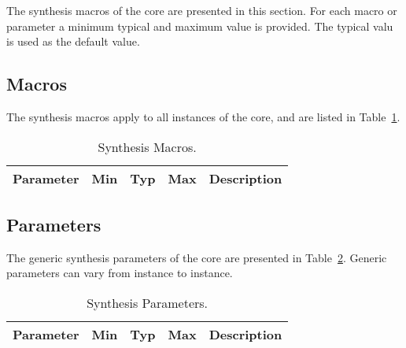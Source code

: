 The synthesis macros of the core are presented in this section. For each macro
or parameter a minimum typical and maximum value is provided. The typical valu
is used as the default value.

\subsection{Macros}
\label{sec:macr}

The synthesis macros apply to all instances of the core, and are listed in Table~\ref{tab:sm}.

\begin{table}[H]
  \centering
    \begin{tabularx}{\textwidth}{ | c | c | c | c | X | }
    \hline
    \rowcolor{iob-green}
    {\bf Parameter} & {\bf Min} & {\bf Typ} & {\bf Max} & {\bf Description} \\\hline

    

    \end{tabularx}
  \caption{Synthesis Macros.}
  \label{tab:sm}
\end{table}

\subsection{Parameters}
\label{sec:param}

The generic synthesis parameters of the core are presented in Table~\ref{tab:sp}. Generic parameters can vary from instance to instance.

\begin{table}[H]
  \centering
    \begin{tabularx}{\textwidth}{ | c | c | c | c | X | }
    \hline
    \rowcolor{iob-green}
    {\bf Parameter} & {\bf Min} & {\bf Typ} & {\bf Max} & {\bf Description} \\\hline

    

    \end{tabularx}
  \caption{Synthesis Parameters.}
  \label{tab:sp}
\end{table}

